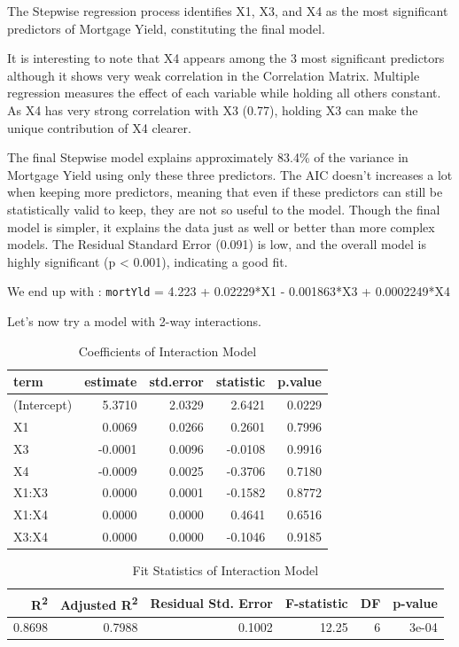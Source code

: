 \documentclass[
  11pt,
]{article}
\begin{document}
The Stepwise regression process identifies X1, X3, and X4 as the most
significant predictors of Mortgage Yield, constituting the final model.

It is interesting to note that X4 appears among the 3 most significant
predictors although it shows very weak correlation in the Correlation
Matrix. Multiple regression measures the effect of each variable while
holding all others constant. As X4 has very strong correlation with X3
(0.77), holding X3 can make the unique contribution of X4 clearer.

The final Stepwise model explains approximately 83.4\% of the variance
in Mortgage Yield using only these three predictors. The AIC doesn't
increases a lot when keeping more predictors, meaning that even if these
predictors can still be statistically valid to keep, they are not so
useful to the model. Though the final model is simpler, it explains the
data just as well or better than more complex models. The Residual
Standard Error (0.091) is low, and the overall model is highly
significant (p \textless{} 0.001), indicating a good fit.

We end up with : \texttt{mortYld} = 4.223 + 0.02229*X1 - 0.001863*X3 +
0.0002249*X4

Let's now try a model with 2-way interactions.

\begin{table}[!h]
\centering
\caption{\label{tab:unnamed-chunk-15}Coefficients of Interaction Model}
\centering
\fontsize{8}{10}\selectfont
\begin{tabular}[t]{lrrrr}
\toprule
term & estimate & std.error & statistic & p.value\\
\midrule
(Intercept) & 5.3710 & 2.0329 & 2.6421 & 0.0229\\
X1 & 0.0069 & 0.0266 & 0.2601 & 0.7996\\
X3 & -0.0001 & 0.0096 & -0.0108 & 0.9916\\
X4 & -0.0009 & 0.0025 & -0.3706 & 0.7180\\
X1:X3 & 0.0000 & 0.0001 & -0.1582 & 0.8772\\
\addlinespace
X1:X4 & 0.0000 & 0.0000 & 0.4641 & 0.6516\\
X3:X4 & 0.0000 & 0.0000 & -0.1046 & 0.9185\\
\bottomrule
\end{tabular}
\end{table}

\begin{table}[!h]
\centering
\caption{\label{tab:unnamed-chunk-16}Fit Statistics of Interaction Model}
\centering
\fontsize{8}{10}\selectfont
\begin{tabular}[t]{rrrrrr}
\toprule
R\textsuperscript{2} & Adjusted R\textsuperscript{2} & Residual Std. Error & F-statistic & DF & p-value\\
\midrule
0.8698 & 0.7988 & 0.1002 & 12.25 & 6 & 3e-04\\
\bottomrule
\end{tabular}
\end{table}
\end{document}
